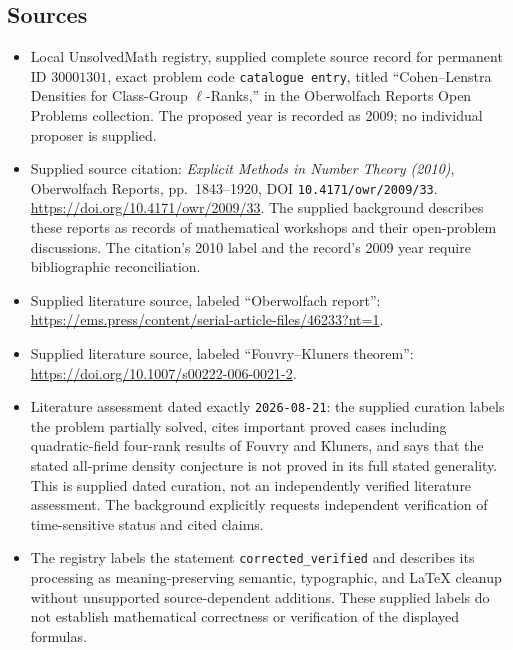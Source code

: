 \documentclass[11pt]{article}
\begin{document}
\subsection{Sources}
\begin{itemize}
\item Local UnsolvedMath registry, supplied complete source record for permanent ID \(30001301\), exact problem code \texttt{catalogue entry}, titled ``Cohen--Lenstra Densities for Class-Group \(\ell\)-Ranks,'' in the Oberwolfach Reports Open Problems collection. The proposed year is recorded as 2009; no individual proposer is supplied.
\item Supplied source citation: \emph{Explicit Methods in Number Theory (2010)}, Oberwolfach Reports, pp.~1843--1920, DOI \texttt{10.4171/owr/2009/33}. \url{https://doi.org/10.4171/owr/2009/33}. The supplied background describes these reports as records of mathematical workshops and their open-problem discussions. The citation's 2010 label and the record's 2009 year require bibliographic reconciliation.
\item Supplied literature source, labeled ``Oberwolfach report'': \url{https://ems.press/content/serial-article-files/46233?nt=1}.
\item Supplied literature source, labeled ``Fouvry--Kluners theorem'': \url{https://doi.org/10.1007/s00222-006-0021-2}.
\item Literature assessment dated exactly \texttt{2026-08-21}: the supplied curation labels the problem partially solved, cites important proved cases including quadratic-field four-rank results of Fouvry and Kluners, and says that the stated all-prime density conjecture is not proved in its full stated generality. This is supplied dated curation, not an independently verified literature assessment. The background explicitly requests independent verification of time-sensitive status and cited claims.
\item The registry labels the statement \texttt{corrected\_verified} and describes its processing as meaning-preserving semantic, typographic, and LaTeX cleanup without unsupported source-dependent additions. These supplied labels do not establish mathematical correctness or verification of the displayed formulas.
\end{itemize}
\end{document}
